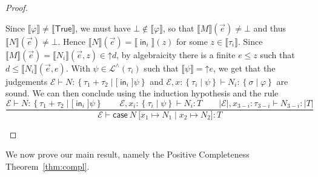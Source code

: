 \documentclass[%
  a4paper,
  UKenglish,
  cleveref,
  autoref,
  thm-restate,
  numberwithinsect,
]{lipics-v2021}
\newcommand\thesis{\vdash}
\newcommand\copair[1]{{\lbrack #1 \rbrack}}
\newcommand\up{\mathord{\uparrow}}
\newcommand\I[1]{\llbracket #1 \rrbracket} %
\newcommand\temp[1]{\mathsf{#1}}
\newcommand\True{\temp{True}}
\newcommand\Env{\mathcal{E}}    %
\newcommand\term[1]{\mathsf{#1}}
\newcommand\cse{\term{case}}
\newcommand\inj{\mathop{\term{in}}}
\newcommand\reft[1]{\left\{ #1 \right\}}
\newcommand\PT{\tau}		%
\newcommand\PTbis{\sigma}	%
\newcommand\RT{T}               %
\newcommand\UPT[1]{\vert #1 \vert}        %
\newcommand\Lang{\mathcal{L}}
\newcommand\form[1]{\lbrack #1 \rbrack}
\begin{document}
\begin{proof}
\begin{description}
Since $\I\varphi \neq \I\True$,
we must have $\bot \notin \I\varphi$,
so that $\I M(\vec e) \neq \bot$
and thus $\I N(\vec e) \neq \bot$.
Hence $\I N(\vec e) = \I{\inj_i}(z)$ for some $z \in \I{\PT_i}$.
Since $\I M(\vec e) = \I{N_i}(\vec e,z) \in \up d$,
by algebraicity there is a finite $e \leq z$
such that $d \leq \I{N_i}(\vec e,e)$.
With $\psi \in \Lang^\land(\PT_i)$ such that
$\I\psi = \up e$,
we get that the judgements
$\Env \thesis N \colon \reft{\PT_1 + \PT_2 \mid \form{\inj_i}\psi}$
and
$\Env, x\colon \reft{\PT_i \mid \psi} \thesis N_i \colon \reft{\PTbis \mid \varphi}$
are sound.
We can then conclude using the induction hypothesis and the rule
\[
\dfrac{
  \Env \thesis N \colon \reft{\PT_1 + \PT_2 \mid \form{\inj_i}\psi}
  \qquad
  \Env, x_i \colon \reft{\PT_i \mid \psi} \thesis N_i \colon \RT
  \qquad
  \UPT\Env, x_{3-i} \colon \PT_{3-i} \thesis N_{3-i} \colon \UPT\RT}
  {\Env \thesis \cse\ N\ \copair{x_1 \mapsto N_1 \mid x_2 \mapsto N_2} \colon \RT}
\]
\qedhere
\end{description}
\end{proof}

We now prove our main result, namely the Positive Completeness
Theorem~\ref{thm:compl}.

\ThmCompl*
\end{document}
